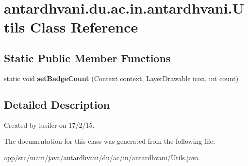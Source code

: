 \hypertarget{classantardhvani_1_1du_1_1ac_1_1in_1_1antardhvani_1_1_utils}{}\section{antardhvani.\+du.\+ac.\+in.\+antardhvani.\+Utils Class Reference}
\label{classantardhvani_1_1du_1_1ac_1_1in_1_1antardhvani_1_1_utils}
\subsection*{Static Public Member Functions}
\begin{DoxyCompactItemize}
\item 
\hypertarget{classantardhvani_1_1du_1_1ac_1_1in_1_1antardhvani_1_1_utils_a6f2841d3ac82d886074174f60c7f7819}{}static void {\bfseries set\+Badge\+Count} (Context context, Layer\+Drawable icon, int count)\label{classantardhvani_1_1du_1_1ac_1_1in_1_1antardhvani_1_1_utils_a6f2841d3ac82d886074174f60c7f7819}

\end{DoxyCompactItemize}


\subsection{Detailed Description}
Created by lusifer on 17/2/15. 

The documentation for this class was generated from the following file\+:\begin{DoxyCompactItemize}
\item 
app/src/main/java/antardhvani/du/ac/in/antardhvani/Utils.\+java\end{DoxyCompactItemize}
